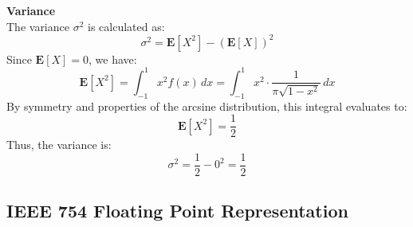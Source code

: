 \documentclass{ioereport}
\begin{document}
\textbf{Variance}\\
The variance \(\sigma^2\) is calculated as:
\begin{equation}
    \sigma^2 = \mathbf{E}[X^2] - (\mathbf{E}[X])^2
\end{equation}
Since \(\mathbf{E}[X] = 0\), we have:
\[
\mathbf{E}[X^2] = \int_{-1}^{1} x^2 f(x) \, dx = \int_{-1}^{1} x^2 \cdot \frac{1}{\pi \sqrt{1-x^2}} \, dx
\]
By symmetry and properties of the arcsine distribution, this integral evaluates to:
\[
\mathbf{E}[X^2] = \frac{1}{2}
\]
Thus, the variance is:
\begin{equation}
    \sigma^2 = \frac{1}{2} - 0^2 = \frac{1}{2}
\end{equation}

\pagebreak

\setcounter{subsection}{3}
\subsection{IEEE 754 Floating Point Representation}
\label{app:ieee-754-fp32}
\end{document}
